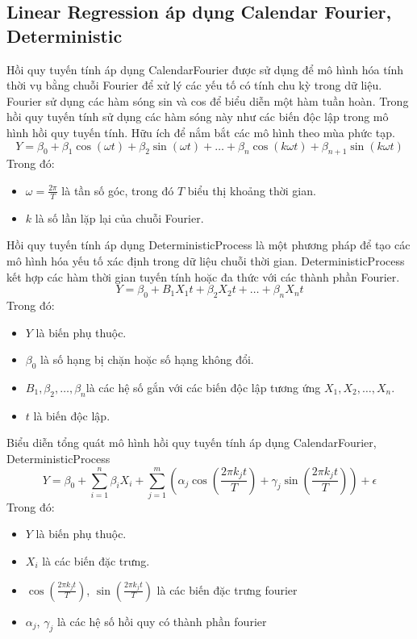 \documentclass[conference]{IEEEtran}
\begin{document}
\subsection{Linear Regression áp dụng Calendar Fourier, Deterministic}
Hồi quy tuyến tính áp dụng CalendarFourier được sử dụng để mô hình hóa tính thời vụ bằng chuỗi Fourier để xử lý các yếu tố có tính chu kỳ trong dữ liệu. Fourier sử dụng các hàm sóng sin và cos để biểu diễn một hàm tuần hoàn. Trong hồi quy tuyến tính sử dụng các hàm sóng này như các biến độc lập trong mô hình hồi quy tuyến tính. Hữu ích để nắm bắt các mô hình theo mùa phức tạp.
\[Y = \beta_0 + \beta_1 \cos(\omega t) + \beta_2 \sin(\omega t) + \ldots + \beta_n \cos(k \omega t) + \beta_{n+1} \sin(k \omega t)\]
Trong đó:
\begin{itemize}
    \item \(\omega = \frac{2\pi}{T}\) là tần số góc, trong đó \(T\) biểu thị khoảng thời gian.
    \item \(k\) là số lần lặp lại của chuỗi Fourier.
\end{itemize}

Hồi quy tuyến tính áp dụng DeterministicProcess là một phương pháp để tạo các mô hình hóa yếu tố xác định trong dữ liệu chuỗi thời gian. DeterministicProcess kết hợp các hàm thời gian tuyến tính hoặc đa thức với các thành phần Fourier. \cite{LRDeterministicProcess}
\[Y = \beta_0 + B_1 X_1 t + \beta_2 X_2 t + \ldots + \beta_n X_n t\]
Trong đó:
\begin{itemize}
    \item \(Y\) là biến phụ thuộc.
    \item \(\beta_0\) là số hạng bị chặn hoặc số hạng không đổi.
    \item \(B_1, \beta_2, \ldots, \beta_n\)là các hệ số gắn với các biến độc lập tương ứng \(X_1, X_2, \ldots, X_n\).
    \item \(t\) là biến độc lập.
\end{itemize}

Biểu diễn tổng quát mô hình hồi quy tuyến tính áp dụng CalendarFourier, DeterministicProcess
\[
Y = \beta_0 + \sum_{i=1}^{n} \beta_i X_i + \sum_{j=1}^{m} \left( \alpha_j \cos\left(\frac{2 \pi k_j t}{T}\right) + \gamma_j \sin\left(\frac{2 \pi k_j t}{T}\right) \right) + \epsilon
\]
Trong đó:
\begin{itemize}
    \item \(Y\) là biến phụ thuộc.
    \item \(X_i\) là các biến đặc trưng.
    \item \(\cos\left(\frac{2 \pi k_j t}{T}\right)\), \(\sin\left(\frac{2 \pi k_j t}{T}\right)\) là các biến đặc trưng fourier
    \item \(\alpha_j\), \(\gamma_j\) là các hệ số hồi quy có thành phần fourier
\end{itemize}
\end{document}
